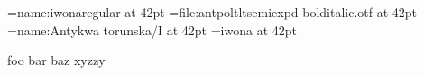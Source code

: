 
\font\first=name:iwonaregular at 42pt
\font\second=file:antpoltltsemiexpd-bolditalic.otf at 42pt
\font\third={name:Antykwa torunska/I} at 42pt
\font\fourth=iwona at 42pt

{\first   foo \endgraf}
{\second  bar \endgraf}
{\third   baz \endgraf}
{\fourth  xyzzy \endgraf}

\bye

